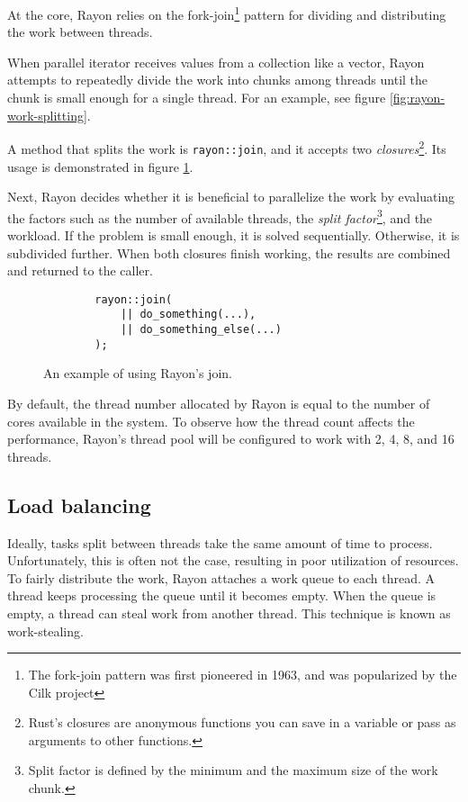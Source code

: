 At the core, Rayon relies on the fork-join\footnote{The fork-join pattern was first pioneered in 1963\cite{history-of-fork-join}, and was popularized by the Cilk project\cite{cilk}} pattern for dividing and distributing the work between threads.  

When parallel iterator receives values from a collection like a vector, Rayon attempts to repeatedly divide the work into chunks among threads until the chunk is small enough for a single thread. For an example, see figure \ref{fig:rayon-work-splitting}.

A method that splits the work is \texttt{rayon::join}, and it accepts two \emph{closures}\footnote{Rust’s closures are anonymous functions you can save in a variable or pass as arguments to other functions.}. Its usage is demonstrated in figure \ref{fig:rayon-join}.

Next, Rayon decides whether it is beneficial to parallelize the work by evaluating the factors such as the number of available threads, the \emph{split factor}\footnote{Split factor is defined by the minimum and the maximum size of the work chunk.}, and the workload. If the problem is small enough, it is solved sequentially. Otherwise, it is subdivided further. When both closures finish working, the results are combined and returned to the caller.

\begin{figure}[!htbp]
    \centering

    \begin{verbatim}
        rayon::join(
            || do_something(...),
            || do_something_else(...)
        );
    \end{verbatim}

    \caption{An example of using Rayon's join.}
    \label{fig:rayon-join}
\end{figure}

By default, the thread number allocated by Rayon is equal to the number of cores available in the system. To observe how the thread count affects the performance, Rayon's thread pool will be configured to work with 2, 4, 8, and 16 threads.

\subsection{Load balancing}
Ideally, tasks split between threads take the same amount of time to process. Unfortunately, this is often not the case, resulting in poor utilization of resources. To fairly distribute the work, Rayon attaches a work queue to each thread. A thread keeps processing the queue until it becomes empty. When the queue is empty, a thread can steal work from another thread. This technique is known as work-stealing.

